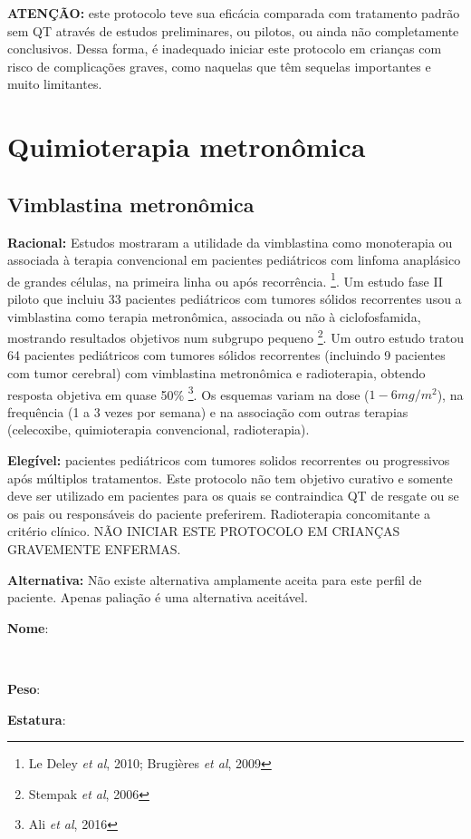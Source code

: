 \documentclass[11pt,a4paper,oldfontcommands]{memoir}
\def\entrywithlabel[#1]#2{\parbox{#1}{{\small #2:} \hrulefill}}
\begin{document}
\textbf{ATENÇÃO:} este protocolo teve sua eficácia comparada com tratamento padrão sem QT através de estudos preliminares, ou pilotos, ou ainda não completamente conclusivos. Dessa forma, é inadequado iniciar este protocolo em crianças com risco de complicações graves, como naquelas que têm sequelas importantes e muito limitantes.

\cleardoublepage
\chapter{Quimioterapia metronômica}
\cleardoublepage

\section{Vimblastina metronômica}
{\let\thefootnote\relax{}}
\textbf{Racional:} Estudos mostraram a utilidade da vimblastina como monoterapia ou associada à terapia convencional em pacientes pediátricos com linfoma anaplásico de grandes células, na primeira linha ou após recorrência.  \footnote{Le Deley \textit{et al}, 2010; Brugières \textit{et al}, 2009}. Um estudo fase II piloto que incluiu 33 pacientes pediátricos com tumores sólidos recorrentes usou a vimblastina como terapia metronômica, associada ou não à ciclofosfamida, mostrando resultados objetivos num subgrupo pequeno \footnote{Stempak \textit{et al}, 2006}. Um outro estudo tratou 64 pacientes pediátricos com tumores sólidos recorrentes (incluindo 9 pacientes com tumor cerebral) com vimblastina metronômica e radioterapia, obtendo resposta objetiva em quase 50\% \footnote{Ali \textit{et al}, 2016}. Os esquemas variam na dose ($1-6 mg/m^2$), na frequência (1 a 3 vezes por semana) e na associação com outras terapias (celecoxibe, quimioterapia convencional, radioterapia). 

\textbf{Elegível:} pacientes pediátricos com tumores solidos recorrentes ou progressivos após múltiplos tratamentos. Este protocolo não tem objetivo curativo e somente deve ser utilizado em pacientes para os quais se contraindica QT de resgate ou se os pais ou responsáveis do paciente preferirem. Radioterapia concomitante a critério clínico. NÃO INICIAR ESTE PROTOCOLO EM CRIANÇAS GRAVEMENTE ENFERMAS.

\textbf{Alternativa:}  Não existe alternativa amplamente aceita para este perfil de paciente. Apenas paliação é uma alternativa aceitável.
\\[0.4cm]
\entrywithlabel[1\hsize]{\textbf{Nome}}\hfill
\\[0.3cm]
\entrywithlabel[.45\hsize]{\textbf{Peso}}\hfill  \entrywithlabel[.45\hsize]{\textbf{Estatura}}
\end{document}
